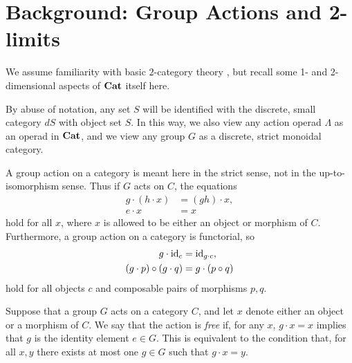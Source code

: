 \label{part:op-in-cat}

\section{Background: Group Actions and 2-limits}\label{sec:backgr-cat}

We assume familiarity with basic $2$-category theory \cite{jy-2dim,KS}, but recall some 1- and 2-dimensional aspects of $\mathbf{Cat}$ itself here.

\begin{conv}\label{conv:set-disc}
By abuse of notation, any set $S$ will be identified with the discrete, small category $dS$ with object set $S$.
In this way, we also view any action operad $\Lambda$ as an operad in $\mathbf{Cat}$, and we view any group $G$ as a discrete, strict monoidal category.
\end{conv}

\begin{conv}\label{conv:group-act-cat}
A group action on a category is meant here in the strict sense, not in the up-to-isomorphism sense.
Thus if $G$ acts on $C$, the equations
\begin{align*}
g \cdot (h \cdot x) & = (gh) \cdot x,\\
e \cdot x & = x
\end{align*}
hold for all $x$, where $x$ is allowed to be either an object or morphism of $C$.
Furthermore, a group action on a category is functorial, so 
\begin{align*}
g \cdot \textrm{id}_{c} & = \textrm{id}_{g \cdot c},\\
(g \cdot p) \circ (g \cdot q) & = g \cdot (p \circ q)
\end{align*}
hold for all objects $c$ and composable pairs of morphisms $p, q$.
\end{conv}

\begin{Defi}\label{Defi:free-action}
Suppose that a group $G$ acts on a category $C$, and let $x$ denote either an object or a morphism of $C$.
We say that the action is \emph{free} if, for any $x$, $g \cdot x = x$ implies that $g$ is the identity element $e \in G$.
This is equivalent to the condition that, for all $x, y$ there exists at most one $g \in G$ such that $g \cdot x = y$.
\end{Defi}

